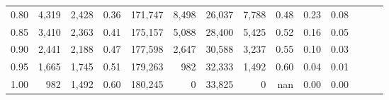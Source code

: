 \begin{tabular}{rrrrrrrrrrrrrr}
0.80 &   4,319 &  2,428 &  0.36 &  171,747 &    8,498 &  26,037 &   7,788 &  0.48 &  0.23 &      0.08 \\
0.85 &   3,410 &  2,363 &  0.41 &  175,157 &    5,088 &  28,400 &   5,425 &  0.52 &  0.16 &      0.05 \\
0.90 &   2,441 &  2,188 &  0.47 &  177,598 &    2,647 &  30,588 &   3,237 &  0.55 &  0.10 &      0.03 \\
0.95 &   1,665 &  1,745 &  0.51 &  179,263 &      982 &  32,333 &   1,492 &  0.60 &  0.04 &      0.01 \\
1.00 &     982 &  1,492 &  0.60 &  180,245 &        0 &  33,825 &       0 &   nan &  0.00 &      0.00 \\
\bottomrule
\end{tabular}
